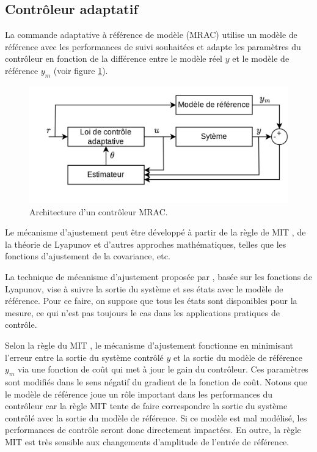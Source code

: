 \subsection*{Contrôleur adaptatif}

La commande adaptative à référence de modèle (MRAC) utilise un modèle de référence avec les performances de suivi souhaitées et adapte les paramètres du contrôleur en fonction de la différence entre le modèle réel $y$ et le modèle de référence $y_{m}$ (voir figure \ref{fig:schemaMRAC}). 

\begin{figure}[ht!]
    \centerline{
    \includegraphics[trim=0cm 0cm 0cm 0cm,clip,width=0.5\columnwidth]{figures/Mrac.png}}
    \caption{Architecture d'un contrôleur MRAC.}
    \label{fig:schemaMRAC}
\end{figure}


Le mécanisme d'ajustement peut être développé à partir de la règle de MIT \cite{Jain2013DesignOA}, de la théorie de Lyapunov \cite{GE1999741, CHAKRABARTY2016213} et d'autres approches mathématiques, telles que les fonctions d'ajustement de la covariance, etc. 

La technique de mécanisme d'ajustement proposée par \cite{CHAKRABARTY2016213}, basée sur les fonctions de Lyapunov, vise à suivre la sortie du système et ses états avec le modèle de référence. Pour ce faire, on suppose que tous les états sont disponibles pour la mesure, ce qui n'est pas toujours le cas dans les applications pratiques de contrôle.

Selon la règle du MIT \cite{Shekhar2018}, le mécanisme d'ajustement fonctionne en minimisant l'erreur entre la sortie du système contrôlé $y$ et la sortie du modèle de référence $y_{m}$ via une fonction de coût qui met à jour le gain du contrôleur. Ces paramètres sont modifiés dans le sens négatif du gradient de la fonction de coût. Notons que le modèle de référence joue un rôle important dans les performances du contrôleur car la règle MIT tente de faire correspondre la sortie du système contrôlé avec la sortie du modèle de référence. Si ce modèle est mal modélisé, les performances de contrôle seront donc directement impactées.
En outre, la règle MIT est très sensible aux changements d'amplitude de l'entrée de référence.

